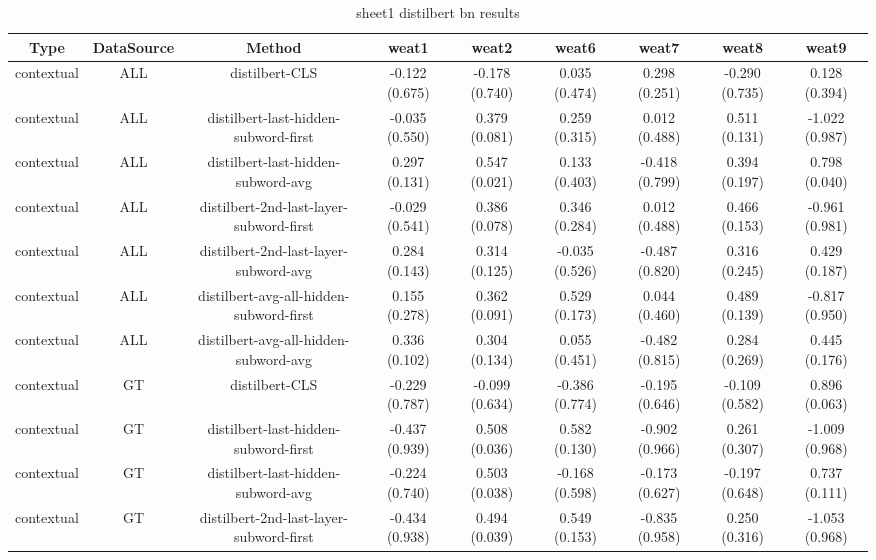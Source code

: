 \begin{sidewaystable}[htb]
    \centering
    \caption{sheet1 distilbert bn results}
    \label{appendix_tab:sheet1_distilbert_bn_results}
    \small
    \begin{tabular}{@{}ccccccccc@{}}
        \toprule
        Type & DataSource & Method & weat1 & weat2 & weat6 & weat7 & weat8 & weat9 \\
        \midrule
        contextual & ALL & distilbert-CLS & -0.122 (0.675) & -0.178 (0.740) & 0.035 (0.474) & 0.298 (0.251) & -0.290 (0.735) & 0.128 (0.394) \\
        contextual & ALL & distilbert-last-hidden-subword-first & -0.035 (0.550) & 0.379 (0.081) & 0.259 (0.315) & 0.012 (0.488) & 0.511 (0.131) & -1.022 (0.987) \\
        contextual & ALL & distilbert-last-hidden-subword-avg & 0.297 (0.131) & 0.547 (0.021) & 0.133 (0.403) & -0.418 (0.799) & 0.394 (0.197) & 0.798 (0.040) \\
        contextual & ALL & distilbert-2nd-last-layer-subword-first & -0.029 (0.541) & 0.386 (0.078) & 0.346 (0.284) & 0.012 (0.488) & 0.466 (0.153) & -0.961 (0.981) \\
        contextual & ALL & distilbert-2nd-last-layer-subword-avg & 0.284 (0.143) & 0.314 (0.125) & -0.035 (0.526) & -0.487 (0.820) & 0.316 (0.245) & 0.429 (0.187) \\
        contextual & ALL & distilbert-avg-all-hidden-subword-first & 0.155 (0.278) & 0.362 (0.091) & 0.529 (0.173) & 0.044 (0.460) & 0.489 (0.139) & -0.817 (0.950) \\
        contextual & ALL & distilbert-avg-all-hidden-subword-avg & 0.336 (0.102) & 0.304 (0.134) & 0.055 (0.451) & -0.482 (0.815) & 0.284 (0.269) & 0.445 (0.176) \\
        contextual & GT & distilbert-CLS & -0.229 (0.787) & -0.099 (0.634) & -0.386 (0.774) & -0.195 (0.646) & -0.109 (0.582) & 0.896 (0.063) \\
        contextual & GT & distilbert-last-hidden-subword-first & -0.437 (0.939) & 0.508 (0.036) & 0.582 (0.130) & -0.902 (0.966) & 0.261 (0.307) & -1.009 (0.968) \\
        contextual & GT & distilbert-last-hidden-subword-avg & -0.224 (0.740) & 0.503 (0.038) & -0.168 (0.598) & -0.173 (0.627) & -0.197 (0.648) & 0.737 (0.111) \\
        contextual & GT & distilbert-2nd-last-layer-subword-first & -0.434 (0.938) & 0.494 (0.039) & 0.549 (0.153) & -0.835 (0.958) & 0.250 (0.316) & -1.053 (0.968) \\

\end{tabular}
\end{sidewaystable}
